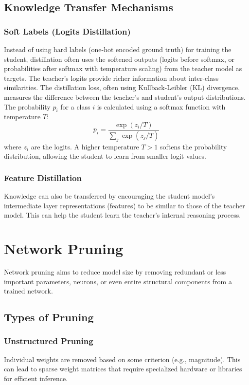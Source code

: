\documentclass[12pt, a4paper]{report}
\begin{document}
\subsection{Knowledge Transfer Mechanisms}
\subsubsection{Soft Labels (Logits Distillation)}
Instead of using hard labels (one-hot encoded ground truth) for training the student, distillation often uses the softened outputs (logits before softmax, or probabilities after softmax with temperature scaling) from the teacher model as targets. The teacher's logits provide richer information about inter-class similarities.
The distillation loss, often using Kullback-Leibler (KL) divergence, measures the difference between the teacher's and student's output distributions.
The probability $p_i$ for a class $i$ is calculated using a softmax function with temperature $T$:
$$ p_i = \frac{\exp(z_i / T)}{\sum_j \exp(z_j / T)} $$
where $z_i$ are the logits. A higher temperature $T > 1$ softens the probability distribution, allowing the student to learn from smaller logit values.

\subsubsection{Feature Distillation}
Knowledge can also be transferred by encouraging the student model's intermediate layer representations (features) to be similar to those of the teacher model. This can help the student learn the teacher's internal reasoning process.

\section{Network Pruning}
\label{sec:network_pruning_methods}
Network pruning aims to reduce model size by removing redundant or less important parameters, neurons, or even entire structural components from a trained network.

\subsection{Types of Pruning}
\subsubsection{Unstructured Pruning}
Individual weights are removed based on some criterion (e.g., magnitude). This can lead to sparse weight matrices that require specialized hardware or libraries for efficient inference.
\end{document}
